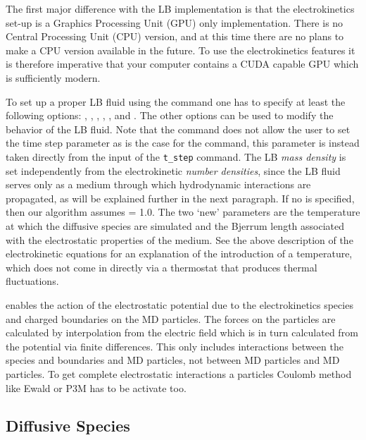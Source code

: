 The first major difference with the LB implementation is that the 
electrokinetics set-up is a Graphics Processing Unit (GPU) only implementation. 
There is no Central Processing Unit (CPU) version, and at this time there are no
plans to make a CPU version available in the future. To use the electrokinetics
features it is therefore imperative that your computer contains a CUDA capable
GPU which is sufficiently modern. 

To set up a proper LB fluid using the  command one has to
specify at least the following options: , , ,
, , and . The other options can be used to 
modify the behavior of the LB fluid. Note that the  command 
does not allow the user to set the time step parameter  as is the case for
the  command, this parameter is instead taken directly from the input
of the  \texttt{t\_step} command. The LB \emph{mass density} is set 
independently from the electrokinetic \emph{number densities}, since the LB fluid 
serves only as a medium through which hydrodynamic interactions are propagated, 
as will be explained further in the next paragraph. If no  is
specified, then our algorithm assumes  = 1.0. The two `new'
parameters are  the temperature at which the diffusive species are simulated
and  the Bjerrum length associated with the electrostatic 
properties of the medium. See the above description of the electrokinetic 
equations for an explanation of the introduction of a temperature, which does 
not come in directly via a thermostat that produces thermal fluctuations.

 enables the action of the electrostatic potential
due to the electrokinetics species and charged boundaries on the MD particles.
The forces on the particles are calculated by interpolation from the electric
field which is in turn calculated from the potential via finite differences.
This only includes interactions between the species and boundaries and MD
particles, not between MD particles and MD particles. To get complete electrostatic
interactions a particles Coulomb method like Ewald or P3M has to be activate too.

\subsection{\label{ssec:ek-diff-species}Diffusive Species}

